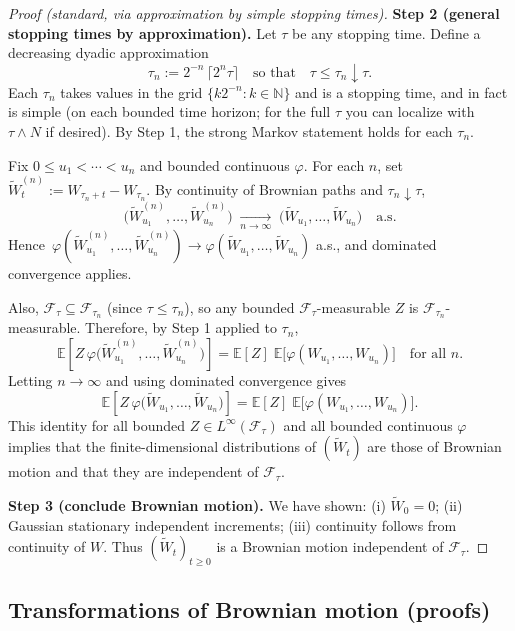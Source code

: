 \documentclass[11pt]{article}
\theoremstyle{definition}
\theoremstyle{remark}
\newcommand{\E}{\mathbb{E}}
\newcommand{\N}{\mathbb{N}}
\newcommand{\cF}{\mathcal{F}}
\begin{document}
\begin{proof}[Proof (standard, via approximation by simple stopping times)]
\medskip
\textbf{Step 2 (general stopping times by approximation).}
Let $\tau$ be any stopping time. Define a decreasing dyadic approximation
\[
\tau_n := 2^{-n}\,\big\lceil 2^n \tau \big\rceil
\quad\text{so that}\quad
\tau \le \tau_n \downarrow \tau.
\]
Each $\tau_n$ takes values in the grid $\{k2^{-n}:k\in\N\}$ and is a stopping time, and in fact is simple
(on each bounded time horizon; for the full $\tau$ you can localize with $\tau\wedge N$ if desired).
By Step 1, the strong Markov statement holds for each $\tau_n$.

Fix $0\le u_1<\cdots<u_n$ and bounded continuous $\varphi$.
For each $n$, set $\widetilde W^{(n)}_t:=W_{\tau_n+t}-W_{\tau_n}$.
By continuity of Brownian paths and $\tau_n\downarrow\tau$,
\[
\big(\widetilde W^{(n)}_{u_1},\ldots,\widetilde W^{(n)}_{u_n}\big)
\;\xrightarrow[n\to\infty]{}\;
\big(\widetilde W_{u_1},\ldots,\widetilde W_{u_n}\big)
\quad\text{a.s.}
\]
Hence $\,\varphi(\widetilde W^{(n)}_{u_1},\ldots,\widetilde W^{(n)}_{u_n})
\to \varphi(\widetilde W_{u_1},\ldots,\widetilde W_{u_n})$ a.s.,
and dominated convergence applies.

Also, $\cF_\tau\subseteq \cF_{\tau_n}$ (since $\tau\le\tau_n$), so any bounded
$\cF_\tau$-measurable $Z$ is $\cF_{\tau_n}$-measurable. Therefore, by Step 1 applied to $\tau_n$,
\[
\E\!\left[ Z\,\varphi\big(\widetilde W^{(n)}_{u_1},\ldots,\widetilde W^{(n)}_{u_n}\big)\right]
=\E[Z]\;\E\big[\varphi(W_{u_1},\ldots,W_{u_n})\big]
\quad\text{for all }n.
\]
Letting $n\to\infty$ and using dominated convergence gives
\[
\E\!\left[ Z\,\varphi\big(\widetilde W_{u_1},\ldots,\widetilde W_{u_n}\big)\right]
=\E[Z]\;\E\big[\varphi(W_{u_1},\ldots,W_{u_n})\big].
\]
This identity for all bounded $Z\in L^\infty(\cF_\tau)$ and all bounded continuous $\varphi$
implies that the finite-dimensional distributions of $(\widetilde W_t)$ are those of Brownian motion and
that they are independent of $\cF_\tau$.

\medskip
\textbf{Step 3 (conclude Brownian motion).}
We have shown: (i) $\widetilde W_0=0$; (ii) Gaussian stationary independent increments;
(iii) continuity follows from continuity of $W$.
Thus $(\widetilde W_t)_{t\ge0}$ is a Brownian motion independent of $\cF_\tau$.
\end{proof}


\subsection{Transformations of Brownian motion (proofs)}
\end{document}
